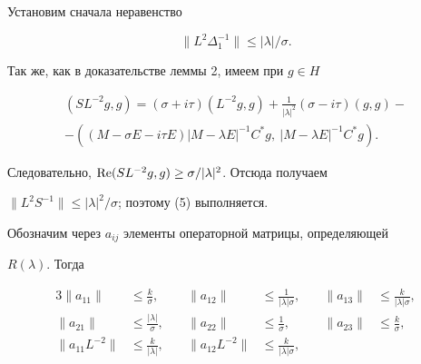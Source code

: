 \begin{pf} 


Установим сначала неравенство 


\begin{equation} 


\|L^2\Delta^{-1}_1\|\le|\lambda|/\sigma. 


\end{equation} 


Так же, как в доказательстве леммы 2, имеем при $g\in H$ 


\begin{multline*} 


(SL^{-2}g,g)=(\sigma+i\tau)(L^{-2}g,g)+\frac{1}{|\lambda|^2} 


(\sigma-i\tau)(g,g)- \\ 


% 


-((M-\sigma E-i\tau E)|M-\lambda E|^{-1} 


C^*g,\ |M-\lambda E|^{-1}C^*g). 


\end{multline*} 


Следовательно, $\operatorname{Re}(SL^{-2}g,g)\ge\sigma/|\lambda|^2$. Отсюда получаем 


$\|L^2S^{-1}\|\le|\lambda|^2/\sigma$; поэтому (5) выполняется. 


 


Обозначим через $a_{ij}$ элементы операторной матрицы, определяющей 


$R(\lambda)$. Тогда 


\begin{alignat*}{3} 


\|a_{11}\|&\le \frac{k}{\sigma}, &\quad 


\|a_{12}\| &\le \frac{1}{|\lambda|\sigma}, &\quad 


\|a_{13}\|&\le \frac{k}{|\lambda|\sigma}, \\ 


% 


\|a_{21}\|&\le \frac{|\lambda|}{\sigma}, &\quad 


\|a_{22}\|&\le \frac{1}{\sigma}, &\quad 


\|a_{23}\|&\le \frac{k}{\sigma},\\ 


% 


\|a_{11}L^{-2}\|&\le \frac{k}{|\lambda|}, &\quad 


\|a_{12}L^{-2}\|& \le \frac{k}{|\lambda|\sigma}, &\quad 



\end{alignat*}
\end{pf}

